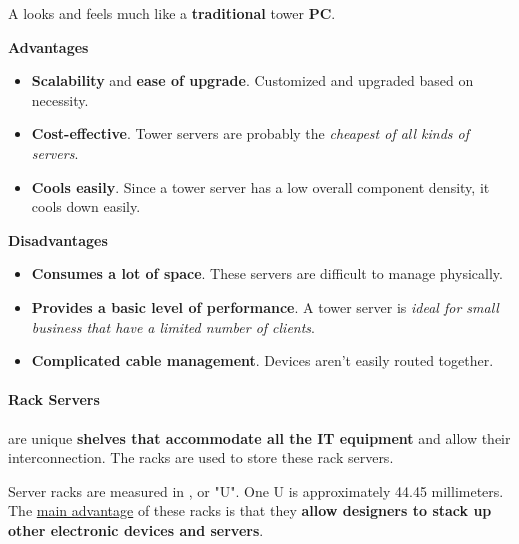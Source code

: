 A  looks and feels much like a \textbf{traditional} tower \textbf{PC}.

\begin{flushleft}
    \textcolor{Green3}{ \textbf{Advantages}}
\end{flushleft}
\begin{itemize}[label=]
    \item \textbf{Scalability} and \textbf{ease of upgrade}. Customized and upgraded based on necessity.

    \item \textbf{Cost-effective}. Tower servers are probably the \emph{cheapest of all kinds of servers}.

    \item \textbf{Cools easily}. Since a tower server has a low overall component density, it cools down easily.
\end{itemize}

\begin{flushleft}
    \textcolor{Red2}{ \textbf{Disadvantages}}
\end{flushleft}
\begin{itemize}[label=]
    \item \textbf{Consumes a lot of space}. These servers are difficult to manage physically.

    \item \textbf{Provides a basic level of performance}. A tower server is \emph{ideal for small business that have a limited number of clients}.

    \item \textbf{Complicated cable management}. Devices aren't easily routed together.
\end{itemize}

\newpage

\paragraph{Rack Servers}

 are unique \textbf{shelves that accommodate all the IT equipment} and allow their interconnection. The racks are used to store these rack servers.

\highspace
Server racks are measured in , or "U". One U is approximately 44.45 millimeters. The \underline{main advantage} of these racks is that they \textbf{allow designers to stack up other electronic devices and servers}.

